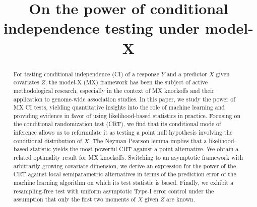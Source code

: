 \documentclass[ejs]{imsart}
\numberwithin{equation}{section}
\theoremstyle{plain}
\theoremstyle{definition}
\theoremstyle{remark}
\begin{document}
\begin{frontmatter}
\title{On the power of conditional independence testing under model-X }


\begin{abstract}
       For testing conditional independence (CI) of a response $Y$ and a predictor $X$ given covariates $Z$, the model-X (MX) framework has been the subject of active methodological research, especially in the context of MX knockoffs and their application to genome-wide association studies. In this paper, we study the power of MX CI tests, yielding quantitative insights into the role of machine learning and providing evidence in favor of using likelihood-based statistics in practice. Focusing on the conditional randomization test (CRT), we find that its conditional mode of inference allows us to reformulate it as testing a point null hypothesis involving the conditional distribution of $X$. The Neyman-Pearson lemma implies that a likelihood-based statistic yields the most powerful CRT against a point alternative. We obtain a related optimality result for MX knockoffs. Switching to an asymptotic framework with arbitrarily growing covariate dimension, we derive an expression for the power of the CRT against local semiparametric alternatives in terms of the prediction error of the machine learning algorithm on which its test statistic is based. Finally, we exhibit a resampling-free test with uniform asymptotic Type-I error control under the assumption that only the first two moments of $X$ given $Z$ are known.
\end{abstract}

\begin{keyword}[class=MSC]
\end{keyword}

\begin{keyword}
\kwd{\LaTeXe}
\end{keyword}
\tableofcontents
\end{frontmatter}
\end{document}
